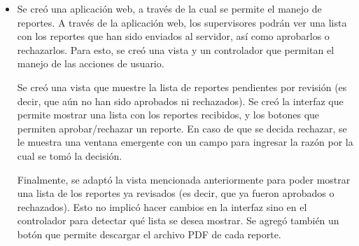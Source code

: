 \begin{itemize}
\item Se creó una aplicación web, a través de la cual se permite el manejo de reportes. A través de la aplicación web, los supervisores podrán ver una lista con los reportes que han sido enviados al servidor, así como aprobarlos o rechazarlos. Para esto, se creó una vista y un controlador que permitan el manejo de las acciones de usuario. 

Se creó una vista que muestre la lista de reportes pendientes por revisión (es decir, que aún no han sido aprobados ni rechazados). Se creó la interfaz que permite mostrar una lista con los reportes recibidos, y los botones que permiten aprobar/rechazar un reporte. En caso de que se decida rechazar, se le muestra una ventana emergente con un campo para ingresar la razón por la cual se tomó la decisión.

Finalmente, se adaptó la vista mencionada anteriormente para poder mostrar una lista de los reportes ya revisados (es decir, que ya fueron aprobados o rechazados). Esto no implicó hacer cambios en la interfaz sino en el controlador para detectar qué lista se desea mostrar. Se agregó también un botón que permite descargar el archivo PDF de cada reporte.
\end{itemize}
%
%
%
%
